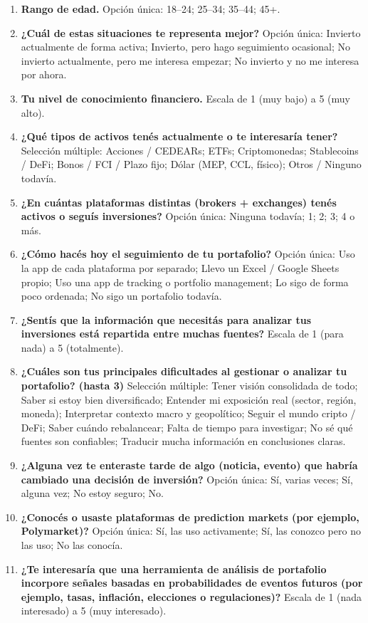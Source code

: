 \begin{enumerate}
    \item \textbf{Rango de edad.} Opción única: 18--24; 25--34; 35--44; 45+.
    \item \textbf{¿Cuál de estas situaciones te representa mejor?} Opción única: Invierto actualmente de forma activa; Invierto, pero hago seguimiento ocasional; No invierto actualmente, pero me interesa empezar; No invierto y no me interesa por ahora.
    \item \textbf{Tu nivel de conocimiento financiero.} Escala de 1 (muy bajo) a 5 (muy alto).
    \item \textbf{¿Qué tipos de activos tenés actualmente o te interesaría tener?} Selección múltiple: Acciones / CEDEARs; ETFs; Criptomonedas; Stablecoins / DeFi; Bonos / FCI / Plazo fijo; Dólar (MEP, CCL, físico); Otros / Ninguno todavía.
    \item \textbf{¿En cuántas plataformas distintas (brokers + exchanges) tenés activos o seguís inversiones?} Opción única: Ninguna todavía; 1; 2; 3; 4 o más.
    \item \textbf{¿Cómo hacés hoy el seguimiento de tu portafolio?} Opción única: Uso la app de cada plataforma por separado; Llevo un Excel / Google Sheets propio; Uso una app de tracking o portfolio management; Lo sigo de forma poco ordenada; No sigo un portafolio todavía.
    \item \textbf{¿Sentís que la información que necesitás para analizar tus inversiones está repartida entre muchas fuentes?} Escala de 1 (para nada) a 5 (totalmente).
    \item \textbf{¿Cuáles son tus principales dificultades al gestionar o analizar tu portafolio? (hasta 3)} Selección múltiple: Tener visión consolidada de todo; Saber si estoy bien diversificado; Entender mi exposición real (sector, región, moneda); Interpretar contexto macro y geopolítico; Seguir el mundo cripto / DeFi; Saber cuándo rebalancear; Falta de tiempo para investigar; No sé qué fuentes son confiables; Traducir mucha información en conclusiones claras.
    \item \textbf{¿Alguna vez te enteraste tarde de algo (noticia, evento) que habría cambiado una decisión de inversión?} Opción única: Sí, varias veces; Sí, alguna vez; No estoy seguro; No.
    \item \textbf{¿Conocés o usaste plataformas de prediction markets (por ejemplo, Polymarket)?} Opción única: Sí, las uso activamente; Sí, las conozco pero no las uso; No las conocía.
    \item \textbf{¿Te interesaría que una herramienta de análisis de portafolio incorpore señales basadas en probabilidades de eventos futuros (por ejemplo, tasas, inflación, elecciones o regulaciones)?} Escala de 1 (nada interesado) a 5 (muy interesado).

\end{enumerate}
